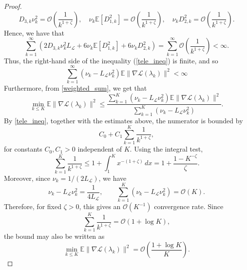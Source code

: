 \documentclass[11pt, twoside]{report}
\begin{document}
\begin{proof}
$$D_{3,k}\nu_k^2 = \mathcal{O}\left(\frac{1}{k^{1+\zeta}}\right), \quad \nu_k\mathbb{E}[D_{1,k}^2] = \mathcal{O}\left(\frac{1}{k^{1+\zeta}} \right), \quad \nu_k D_{2,k}^2 = \mathcal{O}\left(\frac{1}{k^{1+\zeta}} \right).$$
Hence, we have that 
\[\sum_{k=1}^\infty \left(2D_{3,k}\nu_k^2 L_{\mathcal{L}} + 6\nu_k\mathbb{E}[D_{1,k}^2] + 6\nu_kD_{2,k}^2\right) = \sum_{k=1}^\infty \mathcal{O}\left(\frac{1}{k^{1+\zeta}}\right) < \infty.\]
Thus, the right-hand side of the inequality (\ref{tele_ineq}) is finite, and so
\begin{equation} \label{weighted_sum}
    \sum_{k=1}^\infty (\nu_k - L_{\mathcal{L}}\nu_k^2)\mathbb{E}\|\nabla\mathcal{L}(\lambda_k)\|^2 < \infty
\end{equation}
Furthermore, from \eqref{weighted_sum}, we get that
\[
\min_{k\leq K}\mathbb E\|\nabla \mathcal L(\lambda_k)\|^2
\leq
\frac{
\sum_{k=1}^{K}
(\nu_k-L_{\mathcal L}\nu_k^2)
\mathbb E\|\nabla \mathcal L(\lambda_k)\|^2
}{
\sum_{k=1}^{K}
(\nu_k-L_{\mathcal L}\nu_k^2)
}.
\]
By \eqref{tele_ineq}, together with the estimates above, the numerator is bounded by
\[
C_0+C_1\sum_{k=1}^{K}\frac{1}{k^{1+\zeta}},
\]
for constants \(C_0,C_1>0\) independent of \(K\). Using the integral test,
\[
\sum_{k=1}^{K}\frac{1}{k^{1+\zeta}}
\leq
1+\int_1^K x^{-(1+\zeta)}\,dx
=
1+\frac{1-K^{-\zeta}}{\zeta}.
\]
Moreover, since \(\nu_k=1/(2L_{\mathcal L})\), we have
\[
\nu_k-L_{\mathcal L}\nu_k^2=\frac{1}{4L_{\mathcal L}},
\qquad
\sum_{k=1}^{K}(\nu_k-L_{\mathcal L}\nu_k^2)
=
\mathcal O(K).
\]
Therefore, for fixed $\zeta>0$, this gives an $\mathcal O(K^{-1})$ convergence rate. Since
\[
\sum_{k=1}^K\frac1{k^{1+\zeta}}
=\mathcal O(1+\log K),
\]
the bound may also be written as
\[
\min_{k\le K}\mathbb E\|\nabla\mathcal L(\lambda_k)\|^2
=\mathcal O\!\left(\frac{1+\log K}{K}\right).
\]
\end{proof}
\end{document}
